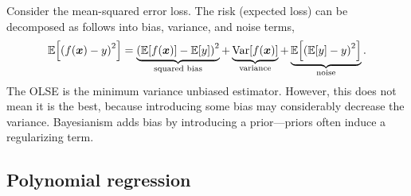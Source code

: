 Consider the mean-squared error loss. The risk (expected loss) can be decomposed as follows into
bias, variance, and noise terms, \[
    \E \lft[ \lft( f(\vec{x}) - y \rgt)^2 \rgt] = \underbrace{\lft( \E[f(\vec{x})] - \E[y] \rgt)^2}_{\text{squared bias}} + \underbrace{\Var[f(\vec{x})]}_{\text{variance}} + \underbrace{\E \lft[ \lft( \E[y] - y \rgt)^2 \rgt]}_{\text{noise}}.
\]
The OLSE is the minimum variance unbiased estimator. However, this does not mean it is the best, because introducing some bias may
considerably decrease the variance. Bayesianism adds bias by introducing a prior---priors often
induce a regularizing term.

\subsection{Polynomial regression}

